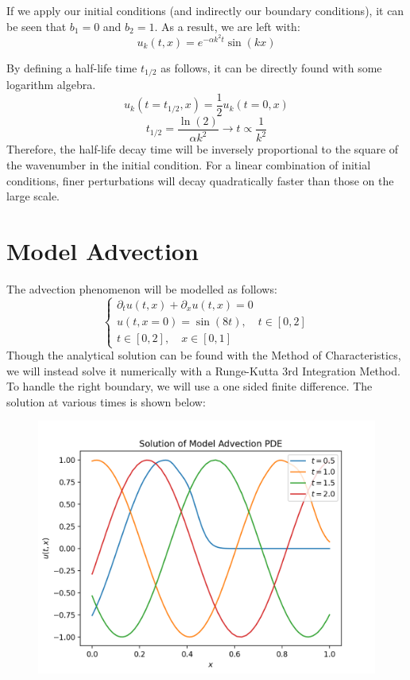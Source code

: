 \documentclass[12pt, reqno]{amsart}
\begin{document}
\begin{multicols}{2}
    If we apply our initial conditions (and indirectly our boundary conditions), it can be seen that $b_1 = 0$ and $b_2 = 1$. As a result, we are left with:
    \begin{equation}
        u_k(t, x) = e^{-\alpha k^2 t} \sin(kx)
    \end{equation}

    By defining a half-life time $t_{1/2}$ as follows, it can be directly found with some logarithm algebra.
    \begin{equation}
        u_k(t = t_{1/2}, x) = \frac{1}{2} u_k(t = 0, x)
    \end{equation}
    \begin{equation}
        t_{1/2}= \frac{\ln(2)}{\alpha k^2} \to t \propto \frac{1}{k^2}
    \end{equation}
    Therefore, the half-life decay time will be inversely proportional to the square of the wavenumber in the initial condition. For a linear combination of initial conditions, finer perturbations will decay quadratically faster than those on the large scale.

    \section{Model Advection}
    The advection phenomenon will be modelled as follows:
    \begin{equation}
        \begin{cases} \partial_t u(t, x) + \partial_x u(t, x) = 0\\
        u(t, x = 0) = \sin(8t), \quad t \in [0, 2] \\
        t \in [0, 2], \quad x \in [0, 1]
        \end{cases}
    \end{equation}
    Though the analytical solution can be found with the Method of Characteristics, we will instead solve it numerically with a Runge-Kutta 3rd Integration Method. To handle the right boundary, we will use a one sided finite difference. The solution at various times is shown below:
    \begin{figure}[H]
        \centering
        \includegraphics[width=1\linewidth]{Solution of Model Advection PDE.png}
    \end{figure}

\end{multicols}
\end{document}
